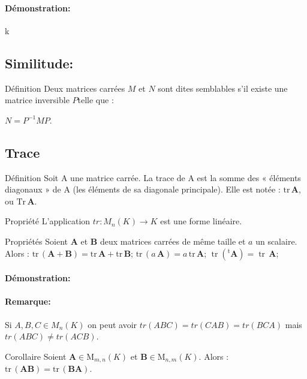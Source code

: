 \documentclass{book}
\begin{document}
\paragraph{Démonstration: }
k
\subsection{Similitude: }
\begin{Définition}[]{Définition}{}
Deux matrices carrées ${\displaystyle M}$ et ${\displaystyle N}$ sont dites semblables s'il existe une matrice inversible ${\displaystyle P} $telle que :

${\displaystyle N=P^{-1}MP}$.
\end{Définition}
\subsection{Trace}
\begin{Définition}[]{Définition}{}
Soit A une matrice carrée. La trace de A est la somme des « éléments diagonaux » de A (les éléments de sa diagonale principale). Elle est notée : ${\displaystyle \mathrm {tr} \,\mathbf {A} }$, ou ${\displaystyle \mathrm {Tr} \,\mathbf {A} }$.
\end{Définition}
\begin{Propriété}[]{Propriété}{}
L'application \(tr:M_{n}(K) \rightarrow K\) est une forme linéaire.
\end{Propriété}
\begin{Propriété}[]{Propriétés}{}
Soient ${\displaystyle \mathbf {A}}$ et ${\displaystyle \mathbf {B}}$ deux matrices carrées de même taille et ${\displaystyle a}$ un scalaire. Alors :
${\displaystyle \mathrm {tr} \,\left(\mathbf {A} +\mathbf {B} \right)=\mathrm {tr} \,\mathbf {A} +\mathrm {tr} \,\mathbf {B} }$;
${\displaystyle \mathrm {tr} \,\left(a\,\mathbf {A} \right)=a\,\mathrm {tr} \,\mathbf {A} }$;
${\displaystyle \operatorname {tr} (^{\operatorname {t} }\!\mathbf {A} )=\operatorname {tr} \,\mathbf {A} }$;
\end{Propriété}
\paragraph{Démonstration: }
\paragraph{Remarque:}
Si \(A,B,C \in M_{n}(K)\) on peut avoir \(tr(ABC)=tr(CAB)=tr(BCA)\) mais \(tr(ABC) \neq tr(ACB)\).
\begin{Propriété}[]{Corollaire}{}
Soient ${\displaystyle \mathbf {A} \in \mathrm {M} _{m,n}(K)}$ et ${\displaystyle \mathbf {B} \in \mathrm {M} _{n,m}(K)}$. Alors :
${\displaystyle \mathrm {tr} \,\left(\mathbf {AB} \right)=\mathrm {tr} \,\left(\mathbf {BA} \right)}$.
\end{Propriété}
\end{document}
